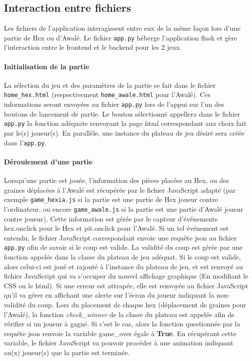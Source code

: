 \subsection{Interaction entre fichiers}
Les fichiers de l'application interagissent entre eux de la même façon lors d'une partie de Hex ou 
d'Awalé. Le fichier \texttt{app.py} héberge l'application flask et gère l'interaction entre le frontend et le 
backend pour les 2 jeux.

\paragraph{Initialisation de la partie}
La sélection du jeu et des paramètres de la partie se fait dans le fichier \texttt{home\_hex.html}
(respectivement \texttt{home\_awale.html} pour l'Awalé). Ces informations seront envoyées au fichier \texttt{app.py}
lors de l'appui sur l'un des boutons de lancement de partie. Le bouton sélectionné appellera dans le fichier \texttt{app.py} la 
fonction adéquate renvoyant la page html correspondant aux choix fait par le(s) joueur(s). En parallèle, une instance du plateau de
jeu désiré sera créée dans l'\texttt{app.py}. 

\paragraph{Déroulement d'une partie}
Lorsqu'une partie est jouée, l'information des pièces placées au Hex, ou des graines déplacées à l'Awalé est récupérée par
le fichier JavaScript adapté (par exemple \texttt{game\_hexia.js} si la partie est une partie de Hex joueur contre l'ordinateur, ou encore 
\texttt{game\_awale.js} si la partie est une partie d'Awalé joueur contre joueur). Cette information est gérée par le capteur d'événements
hex.onclick pour le Hex et pit.onclick pour l'Awalé. Si un tel événement est entendu, le fichier JavaScript correspondant envoie une requête 
json au fichier \texttt{app.py} afin de savoir si le coup est valide. La validité du coup est gérée par une fonction appelée dans la classe du
plateau de jeu adéquat. Si le coup est valide, alors celui-ci est joué et rajouté à l'instance du plateau de jeu, et est renvoyé au fichier 
JavaScript qui va s'occuper du nouvel affichage graphique (En modifiant le CSS ou le html). Si une erreur est attrapée, elle est renvoyée
au fichier JavaScript qu'il va gérer en affichant une alerte sur l'écran du joueur indiquant la non-validité du coup. Lors du placement de chaque
hex (déplacement de graines pour l'Awalé), la fonction \textit{check\_winner} de la classe du plateau est appelée afin de vérifier si un joueur à 
gagné. Si c'est le cas, alors la fonction questionnée par la requête json renvoie la variable \textsf{game\_over} égale à \textbf{True}. 
En récupérant cette variable, le fichier JavaScript va pouvoir procéder à une animation indiquant au(x) joueur(s) que la partie est terminée.







